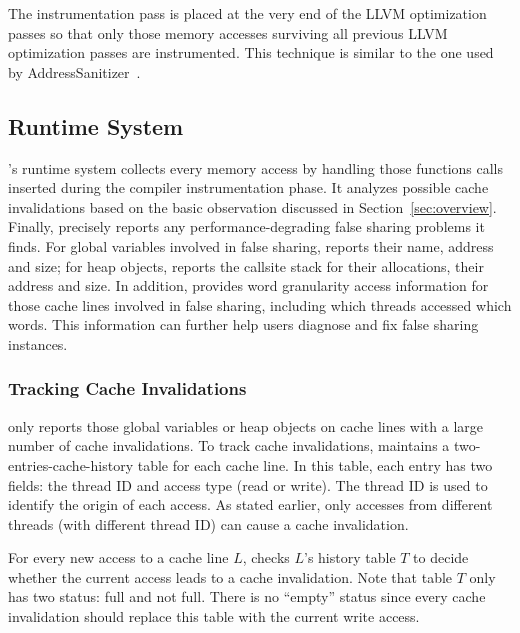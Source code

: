 The instrumentation pass is placed at the very end of the LLVM optimization passes so that only those memory accesses surviving all previous LLVM optimization passes are instrumented.  This technique is similar to the one used by AddressSanitizer~\cite{AddressSanitizer}.

\subsection{Runtime System}
\label{sec:runtime}

\Predator{}'s runtime system collects every memory access by handling those functions calls inserted during the compiler instrumentation phase. It analyzes possible cache invalidations based on the basic observation discussed in Section~\ref{sec:overview}. Finally, \Predator{} precisely reports any performance-degrading false sharing problems it finds.  For global variables involved in false sharing, \Predator{} reports their name, address and size; for heap
objects, \Predator{} reports the callsite stack for their allocations, their address and size. In addition, \Predator{} provides word granularity access information for those cache lines involved in false sharing, including which threads accessed which words.  This information can further help users diagnose and fix false sharing instances.

\subsubsection{Tracking Cache Invalidations}
\Predator{} only reports those global variables or heap objects on cache lines with a large number of cache invalidations. To track cache invalidations, \Predator{} maintains a two-entries-cache-history table for each cache line.  In this table, each entry has two fields: the thread ID and access type (read or write). The thread ID is used to identify the origin of each access. As stated earlier, only accesses from different threads (with different thread ID) can cause a cache invalidation.

For every new access to a cache line $L$, \Predator{} checks $L$'s history table $T$ to decide whether the current access leads to a cache invalidation.  Note that table $T$ only has two status: full and not full.  There is no ``empty'' status since every cache invalidation should replace this table with the current write access.

